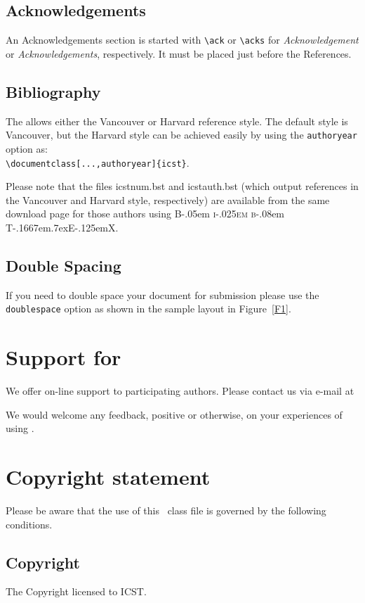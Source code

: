\documentclass[fonts]{icst}
\newcommand\BibTeX{{\rmfamily B\kern-.05em \textsc{i\kern-.025em b}\kern-.08em
T\kern-.1667em\lower.7ex\hbox{E}\kern-.125emX}}
\begin{document}
\subsection{Acknowledgements} An Acknowledgements section is started with \verb"\ack" or
\verb"\acks" for \textit{Acknowledgement} or
\textit{Acknowledgements}, respectively. It must be placed just
before the References.

\subsection{Bibliography}
The \emph{\journalnamelc} allows either the Vancouver or Harvard
reference style. The default style is Vancouver, but the Harvard
style can be achieved easily by using the \verb"authoryear"
option as:\\
\verb"\documentclass[...,authoryear]{icst}".

Please note that the files \textsf{icstnum.bst} and
\textsf{icstauth.bst} (which output references in the Vancouver
and Harvard style, respectively) are available from the same
download page for those authors using \BibTeX.

\subsection{Double Spacing}
If you need to double space your document for submission please
use the \verb+doublespace+ option as shown in the sample layout in
Figure~\ref{F1}.

\section{Support for \textsf{\journalclass}}
We offer on-line support to participating authors. Please contact
us via e-mail at 

We would welcome any feedback, positive or otherwise, on your
experiences of using \textsf{\journalclass}.

\section{Copyright statement}
Please  be  aware that the use of  this \LaTeXe\ class file is
governed by the following conditions.

\subsection{Copyright}
The Copyright licensed to ICST.
\end{document}
